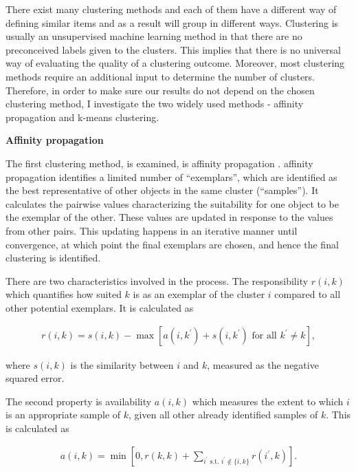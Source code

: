\documentclass[a4paper,12pt]{article}
\begin{document}
There exist many clustering methods and each of them have a different way of defining similar items and as a result will group in different ways. Clustering is usually an unsupervised machine learning method in that there are no preconceived labels given to the clusters. This implies that there is no universal way of evaluating the quality of a clustering outcome. Moreover, most clustering methods require an additional input to determine the number of clusters.  Therefore, in order to make sure our results do not depend on the chosen clustering method, I investigate the two widely used methods - affinity propagation and k-means clustering.

\textbf{Affinity propagation}

The first clustering method, is examined, is affinity propagation \citep{freyDueck07}. affinity propagation identifies a limited number of ``exemplars'', which are identified as the best representative of other objects in the same cluster (``samples''). It calculates the pairwise values characterizing the suitability for one object to be the exemplar of the other. These values are updated in response to the values from other pairs. This updating happens in an iterative manner until convergence, at which point the final exemplars are chosen, and hence the final clustering is identified.

There are two characteristics involved in the process. The responsibility $r\left(i,k\right)$ which quantifies how suited $k$ is as an exemplar of the cluster $i$ compared to all other potential exemplars. It is calculated as

\begin{align}\label{eq:affinityPropagationExemplars}
    r\left(i,k\right) = s\left(i,k\right) - \max\left[a\left(i,k^\prime\right) + s\left(i,k^\prime\right) \text{ for all } k^\prime \neq k\right],
\end{align}

where $s\left(i,k\right)$ is the similarity between $i$ and $k$, measured as the negative squared error.

The second property is availability $a\left(i,k\right)$ which measures the extent to which $i$ is an appropriate sample of $k$, given all other already identified samples of $k$. This is calculated as

\begin{align}\label{eq:availabilityAffinityPropagation}
    a\left(i,k\right) = \min\left[0, r\left(k,k\right) + \sum_{i^\prime \text{ s.t. } i^\prime \notin \{i,k\}} r\left(i^\prime,k\right)\right].
\end{align}
\end{document}
